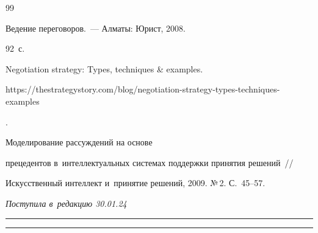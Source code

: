 {{\begin{thebibliography}{99}


   Ведение переговоров.~--- Алматы: Юрист, 2008. 


92~с.




  Negotiation strategy: Types, techniques \& examples. {\sf  


https://thestrategystory.com/\linebreak blog/negotiation-strategy-types-techniques-examples}.




   Моделирование рассуждений на основе 


прецедентов в~интеллектуальных системах поддержки принятия решений~/\!\!/ 


Искусственный интеллект и~принятие решений, 2009. №\,2. С.~45--57.


     \end{thebibliography}


} }











\vspace*{-6pt}





\hfill{\small\textit{Поступила в~редакцию 30.01.24}}





\vspace*{8pt}





\hrule





\vspace*{2pt}








\hrule















